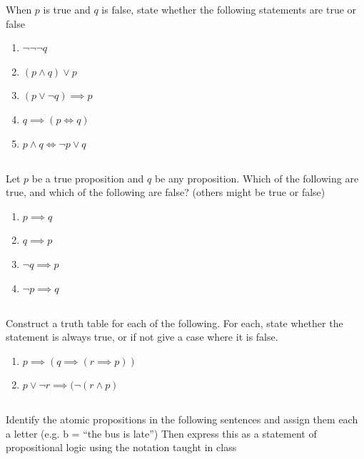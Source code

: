 \documentclass[twocolumn]{article}
\begin{document}
When $p$ is true and $q$ is false, state whether the following statements are true or false

\begin{enumerate}
    \item $\neg \neg \neg q$
    \item $(p \wedge q) \vee p$
    \item $(p \vee \neg q) \implies p$
    \item $q \implies (p \Longleftrightarrow q)$
    \item $p \wedge q \Longleftrightarrow \neg p \vee q$
\end{enumerate}

\subsection{}

Let $p$ be a true proposition and $q$ be any proposition. Which of the following are true, and which of the following are false? (others might be true or false)

\begin{enumerate}
    \item $p \implies q$
    \item $q \implies p$
    \item $\neg q \implies p$
    \item $\neg p \implies q$
\end{enumerate}

\subsection{}

Construct a truth table for each of the following. For each, state whether the statement is always true, or if not give a case where it is false.

\begin{enumerate}
    \item $ p \implies (q \implies ( r \implies p )) $
    \item $ p \vee \neg r \implies (\neg ( r \wedge p ) $
\end{enumerate}

\subsection{}

Identify the atomic propositions in the following sentences and assign them each a letter (e.g. b = ``the bus is late'') Then express this as a statement of propositional logic using the notation taught in class
\end{document}

